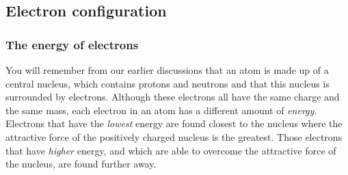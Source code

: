             \subsection{ Electron configuration}
            \nopagebreak
      \label{m38741*uid79}
            \subsubsection{ The energy of electrons}
            \nopagebreak
        \label{m38741*id259210}You will remember from our earlier discussions that an atom is made up of a central nucleus, which contains protons and neutrons and that this nucleus is surrounded by electrons. Although these electrons all have the same charge and the same mass, each electron in an atom has a different amount of \textsl{energy}. Electrons that have the \textsl{lowest} energy are found closest to the nucleus where the attractive force of the positively charged nucleus is the greatest. Those electrons that have \textsl{higher} energy, and which are able to overcome the attractive force of the nucleus, are found further away.\par 
      \label{m38741*uid81}
